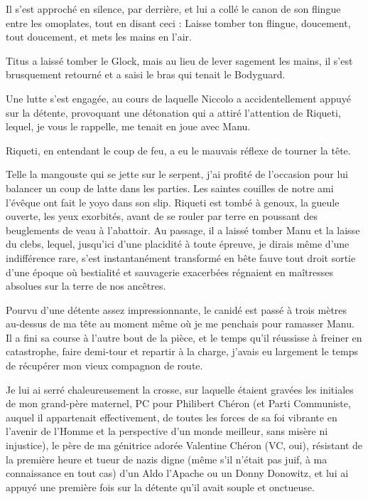 Il s’est approché en silence, par derrière, et lui a collé le canon de son flingue entre les omoplates, tout en disant ceci : Laisse tomber ton flingue, doucement, tout doucement, et mets les mains en l’air.

Titus a laissé tomber le Glock, mais au lieu de lever sagement les mains, il s’est brusquement retourné et a saisi le bras qui tenait le Bodyguard.

Une lutte s’est engagée, au cours de laquelle Niccolo a accidentellement appuyé sur la détente, provoquant une détonation qui a attiré l’attention de Riqueti, lequel, je vous le rappelle, me tenait en joue avec Manu.

Riqueti, en entendant le coup de feu, a eu le mauvais réflexe de tourner la tête.

Telle la mangouste qui se jette sur le serpent, j’ai profité de l’occasion pour lui balancer un coup de latte dans les parties. Les saintes couilles de notre ami l’évêque ont fait le yoyo dans son slip. Riqueti est tombé à genoux, la gueule ouverte, les yeux exorbités, avant de se rouler par terre en poussant des beuglements de veau à l’abattoir. Au passage, il a laissé tomber Manu et la laisse du clebs, lequel, jusqu’ici d’une placidité à toute épreuve, je dirais même d’une indifférence rare, s’est instantanément transformé en bête fauve tout droit sortie d’une époque où bestialité et sauvagerie exacerbées régnaient en maîtresses absolues sur la terre de nos ancêtres.

Pourvu d’une détente assez impressionnante, le canidé est passé à trois mètres au-dessus de ma tête au moment même où je me penchais pour ramasser Manu. Il a fini sa course à l’autre bout de la pièce, et le temps qu’il réussisse à freiner en catastrophe, faire demi-tour et repartir à la charge, j’avais eu largement le temps de récupérer mon vieux compagnon de route.

Je lui ai serré chaleureusement la crosse, sur laquelle étaient gravées les initiales de mon grand-père maternel, PC pour Philibert Chéron (et Parti Communiste, auquel il appartenait effectivement, de toutes les forces de sa foi vibrante en l’avenir de l’Homme et la perspective d’un monde meilleur, sans misère ni injustice), le père de ma génitrice adorée Valentine Chéron (VC, oui), résistant de la première heure et tueur de nazis digne (même s’il n’était pas juif, à ma connaissance en tout cas) d’un Aldo l’Apache ou un Donny Donowitz, et lui ai appuyé une première fois sur la détente qu’il avait souple et onctueuse.

